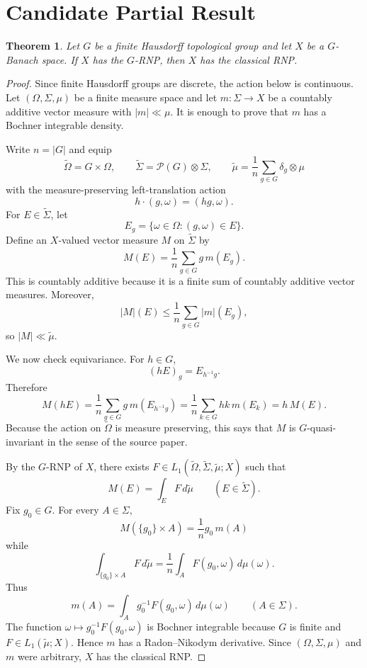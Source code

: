\documentclass[11pt]{article}
\newtheorem{theorem}{Theorem}
\newcommand{\abs}[1]{\left|#1\right|}
\begin{document}
\section*{Candidate Partial Result}

\begin{theorem}
Let $G$ be a finite Hausdorff topological group and let $X$ be a
$G$-Banach space. If $X$ has the $G$-RNP, then $X$ has the classical RNP.
\end{theorem}

\begin{proof}
Since finite Hausdorff groups are discrete, the action below is continuous.
Let $(\Omega,\Sigma,\mu)$ be a finite measure space and let
$m:\Sigma\to X$ be a countably additive vector measure with $\abs{m}\ll\mu$.
It is enough to prove that $m$ has a Bochner integrable density.

Write $n=\abs{G}$ and equip
\[
  \widetilde\Omega=G\times \Omega,\qquad
  \widetilde\Sigma=\mathcal P(G)\otimes \Sigma,\qquad
  \widetilde\mu=\frac{1}{n}\sum_{g\in G}\delta_g\otimes\mu
\]
with the measure-preserving left-translation action
\[
  h\cdot(g,\omega)=(hg,\omega).
\]
For $E\in\widetilde\Sigma$, let
\[
  E_g=\{\omega\in\Omega:(g,\omega)\in E\}.
\]
Define an $X$-valued vector measure $M$ on $\widetilde\Sigma$ by
\[
  M(E)=\frac{1}{n}\sum_{g\in G} g\,m(E_g).
\]
This is countably additive because it is a finite sum of countably additive
vector measures. Moreover,
\[
  \abs{M}(E)\leq \frac{1}{n}\sum_{g\in G}\abs{m}(E_g),
\]
so $\abs{M}\ll\widetilde\mu$.

We now check equivariance. For $h\in G$,
\[
  (hE)_g=E_{h^{-1}g}.
\]
Therefore
\[
  M(hE)
  =\frac{1}{n}\sum_{g\in G}g\,m(E_{h^{-1}g})
  =\frac{1}{n}\sum_{k\in G}hk\,m(E_k)
  =h\,M(E).
\]
Because the action on $\widetilde\Omega$ is measure preserving, this says that
$M$ is $G$-quasi-invariant in the sense of the source paper.

By the $G$-RNP of $X$, there exists
$F\in L_1(\widetilde\Omega,\widetilde\Sigma,\widetilde\mu;X)$ such that
\[
  M(E)=\int_E F\,d\widetilde\mu
  \qquad(E\in\widetilde\Sigma).
\]
Fix $g_0\in G$. For every $A\in\Sigma$,
\[
  M(\{g_0\}\times A)=\frac1n g_0\,m(A)
\]
while
\[
  \int_{\{g_0\}\times A} F\,d\widetilde\mu
  =\frac1n\int_A F(g_0,\omega)\,d\mu(\omega).
\]
Thus
\[
  m(A)=\int_A g_0^{-1}F(g_0,\omega)\,d\mu(\omega)
  \qquad(A\in\Sigma).
\]
The function $\omega\mapsto g_0^{-1}F(g_0,\omega)$ is Bochner integrable
because $G$ is finite and $F\in L_1(\widetilde\mu;X)$. Hence $m$ has a
Radon--Nikodym derivative. Since $(\Omega,\Sigma,\mu)$ and $m$ were arbitrary,
$X$ has the classical RNP.
\end{proof}
\end{document}
